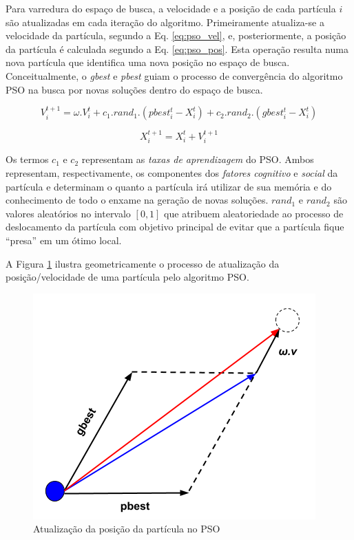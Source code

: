 \documentclass[
	12pt,				%
	openany,			%
	oneside,	
	a4paper,			%
	brazil,				%
	]{unimontes-ppgmsc-abntex2}
\begin{document}
Para varredura do espaço de busca, a velocidade e a posição de cada partícula $i$ são atualizadas em cada iteração do algoritmo. Primeiramente atualiza-se a velocidade da partícula, segundo a Eq. \ref{eq:pso_vel}, e, posteriormente, a posição da partícula é calculada segundo a Eq. \ref{eq:pso_pos}. Esta operação resulta numa nova partícula que identifica uma nova posição no espaço de busca. Conceitualmente, o {\em gbest} e {\em pbest} guiam o processo de convergência do algoritmo PSO na busca por novas soluções dentro do espaço de busca. 

\begin{equation}
\label{eq:pso_vel}
V^{t+1}_{i} = \omega . V^{t}_{i} + c_1 . rand_1 . (pbest^{t}_{i} - X^{t}_{i}) + c_2 . rand_2 . (gbest^{t}_{i} - X^{t}_{i})
\end{equation}

\begin{equation}
\label{eq:pso_pos}
X^{t+1}_{i} = X^{t}_{i} + V^{t+1}_{i}
\end{equation}

Os termos $c_1$ e $c_2$ representam as {\em taxas de aprendizagem} do PSO. Ambos representam, respectivamente, os componentes dos {\em fatores cognitivo} e {\em social} da partícula e determinam o quanto a partícula irá utilizar de sua memória e do conhecimento de todo o enxame na geração de novas soluções. $rand_1$ e $rand_2$ são valores aleatórios no intervalo $[0,1]$ que atribuem aleatoriedade ao processo de deslocamento da partícula com objetivo principal de evitar que a partícula fique ``presa'' em um ótimo local.

A Figura \ref{fig:nova_part} ilustra geometricamente o processo de atualização da posição/velocidade de uma partícula pelo algoritmo PSO.

\begin{figure}[ht]
\label{fig:nova_part}
\centering
\includegraphics[scale=.5]{img/nova_part}
\caption{Atualização da posição da partícula no PSO}
\end{figure}
\end{document}

